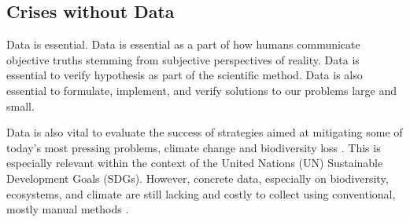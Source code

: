 \subsection{Crises without Data}

Data is essential. Data is essential as a part of how humans communicate objective truths stemming from subjective perspectives of reality. Data is essential to verify hypothesis as part of the scientific method. Data is also essential to formulate, implement, and verify solutions to our problems large and small. 

Data is also vital to evaluate the success of strategies aimed at mitigating some of today's most pressing problems, climate change and biodiversity loss \cite{Gonzalez2023}. This is especially relevant within the context of the United Nations (UN) Sustainable Development Goals (SDGs). However, concrete data, especially on biodiversity, ecosystems, and climate are still lacking \cite{Goessmann2023} and costly to collect using conventional, mostly manual methods \cite{Cannon2021, UNEnvironment2019}. 

